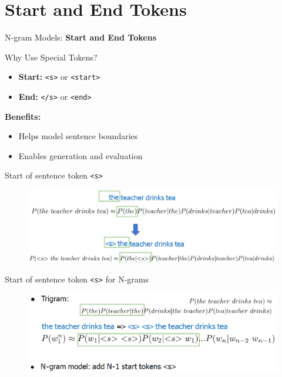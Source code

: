\section{Start and End Tokens}
\begin{frame}{}
    \LARGE N-gram Models: \textbf{Start and End Tokens}
\end{frame}

\begin{frame}{Why Use Special Tokens?}
    \begin{itemize}
        \item \textbf{Start:} \texttt{<s>} or \texttt{<start>}
        \item \textbf{End:} \texttt{</s>} or \texttt{<end>}
    \end{itemize}
    \vspace{1em}
    \textbf{Benefits:}
    \begin{itemize}
        \item Helps model sentence boundaries
        \item Enables generation and evaluation
    \end{itemize}
\end{frame}

\begin{frame}{Start of sentence token \texttt{<s>}}
    \begin{figure}
        \centering
        \includegraphics[width=\textwidth,height=0.8\textheight,keepaspectratio]{images/nlp-intro/sos-token.png}
    \end{figure}
\end{frame}

\begin{frame}{Start of sentence token \texttt{<s>} for N-grams}
    \begin{figure}
        \centering
        \includegraphics[width=\textwidth,height=0.8\textheight,keepaspectratio]{images/nlp-intro/sos-token-ngram.png}
    \end{figure}
\end{frame}

